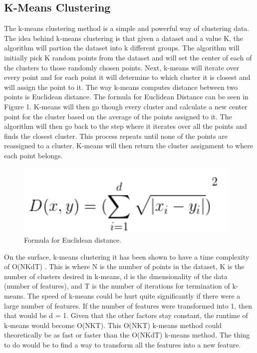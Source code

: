 \documentclass[conference]{IEEEtran}
\begin{document}
\subsection{K-Means Clustering}
The k-means clustering method is a simple and powerful way of clustering data.  The idea behind k-means clustering is that given a dataset and a value K, the algorithm will partion the dataset into k different groups.  The algorithm will initially pick K random points from the dataset and will set the center of each of the clusters to those randomly chosen points.  Next, k-means will iterate over every point and for each point it will determine to which cluster it is closest and will assign the point to it.  The way k-means computes distance between two points is Euclidean distance\cite{Xu2005}.  The formula for Euclidean Distance can be seen in Figure 1.  K-means will then go though every cluster and calculate a new center point for the cluster based on the average of the points assigned to it.  The algorithm will then go back to the step where it iterates over all the points and finds the closest cluster.  This process repeats until none of the points are reassigned to a cluster.  K-means will then return the cluster assignment to where each point belongs.

\begin{figure}[htbp]
\begin{center}
\includegraphics[width=0.4\columnwidth]{EuclideanDistance.png}
\caption{Formula for Euclidean distance.}
\end{center}
\label{fig}
\end{figure}

On the surface, k-means clustering it has been shown to have a time complexity of O(NKdT) \cite{XuRui2008}.  This is where N is the number of points in the dataset, K is the number of clusters desired in k-means, d is the dmensionality of the data (number of features), and T is the number of iterations for termination of k-means.  The speed of k-means could be hurt quite significantly if there were a large number of features.  If the number of features were transformed into 1, then that would be d = 1.  Given that the other factors stay constant, the runtime of k-means would become O(NKT).  This O(NKT) k-means method could theoretically be as fast or faster than the O(NKdT) k-means method.  The thing to do would be to find a way to transform all the features into a new feature.
\end{document}
